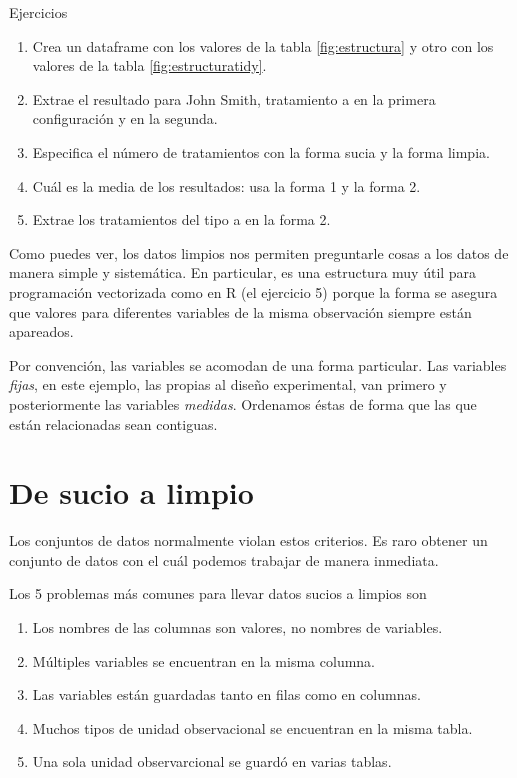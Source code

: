 \documentclass[]{article}
\begin{document}
\begin{bclogo}[
  couleur=llred,
  arrondi=0,
  logo=\bcstop,
  barre=none,
  noborder=true]{Ejercicios}
\begin{enumerate}
\item Crea un dataframe con los valores de la tabla \ref{fig:estructura} y otro 
con los valores de la tabla \ref{fig:estructuratidy}.
\item Extrae el resultado para John Smith, tratamiento a en la primera configuración y en la segunda.
\item Especifica el número de tratamientos con la forma sucia y la forma limpia.
\item Cuál es la media de los resultados: usa la forma 1 y la forma 2.
\item Extrae los tratamientos del tipo a en la forma 2.
\end{enumerate}

\end{bclogo}

Como puedes ver, los datos limpios nos permiten preguntarle cosas a los
datos de manera simple y sistemática. En particular, es una estructura
muy útil para programación vectorizada como en R (el ejercicio 5) porque
la forma se asegura que valores para diferentes variables de la misma
observación siempre están apareados.

Por convención, las variables se acomodan de una forma particular. Las
variables \emph{fijas}, en este ejemplo, las propias al diseño
experimental, van primero y posteriormente las variables \emph{medidas}.
Ordenamos éstas de forma que las que están relacionadas sean contiguas.

\section{De sucio a limpio}\label{de-sucio-a-limpio}

Los conjuntos de datos normalmente violan estos criterios. Es raro
obtener un conjunto de datos con el cuál podemos trabajar de manera
inmediata.

Los 5 problemas más comunes para llevar datos sucios a limpios son

\begin{enumerate}
\def\labelenumi{\arabic{enumi}.}
\itemsep1pt\parskip0pt
\item
  Los nombres de las columnas son valores, no nombres de variables.
\item
  Múltiples variables se encuentran en la misma columna.
\item
  Las variables están guardadas tanto en filas como en columnas.
\item
  Muchos tipos de unidad observacional se encuentran en la misma tabla.
\item
  Una sola unidad observarcional se guardó en varias tablas.
\end{enumerate}
\end{document}
